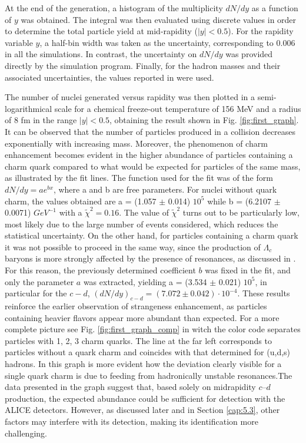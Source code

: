 \documentclass[12pt,a4paper]{book}
\begin{document}
	At the end of the generation, a histogram of the multiplicity $dN/dy$ as a function of $y$ was obtained. The integral was then evaluated using discrete values in order to determine the total particle yield at mid-rapidity ($|y| < 0.5$). For the rapidity variable $y$, a half-bin width was taken as the uncertainty, corresponding to 0.006 in all the simulations. In contrast, the uncertainty on $dN/dy$ was provided directly by the simulation program. Finally, for the hadron masses and their associated uncertainties, the values reported in \cite{ParticleDataGroup:2024cfk} were used.
	
	The number of nuclei generated versus rapidity was then plotted in a semi-logarithmical scale for a chemical freeze-out temperature of 156 MeV and a radius of 8 fm in the range $|y| <0.5$, obtaining the result shown in Fig. \ref{fig:first_graph}. It can be observed that the number of particles produced in a collision decreases exponentially with increasing mass. Moreover, the phenomenon of charm enhancement becomes evident in the higher abundance of particles containing a charm quark compared to what would be expected for particles of the same mass, as illustrated by the fit lines. The function used for the fit was of the form $dN/dy= a e^{bx}$, where a and b are free parameters. For nuclei without quark charm, the values obtained are a = (1.057 $\pm$ 0.014) $10^5$ while b = (6.2107 $\pm$ 0.0071) $GeV^{-1}$ with a $\tilde{\chi}^2 = 0.16$. The value of $\tilde{\chi}^2$ turns out to be particularly low, most likely due to the large number of events considered, which reduces the statistical uncertainty. On the other hand, for particles containing a charm quark it was not possible to proceed in the same way, since the production of $\Lambda_c$ baryons is more strongly affected by the presence of resonances, as discussed in \cite{Andronic_2021}. For this reason, the previously determined coefficient $b$ was fixed in the fit, and only the parameter $a$ was extracted, yielding a = (3.534 $\pm$ 0.021) $10^5$, in particular for the $c-d$, $(dN/dy)_{c-d}= (7.072 \pm 0.042) \cdot 10^{-4}$. These results reinforce the earlier observation of strangeness enhancement, as particles containing heavier flavors appear more abundant than expected. For a more complete picture see Fig. \ref{fig:first_graph_comp} in witch the color code separates particles with 1, 2, 3 charm quarks. The line at the far left corresponds to particles without a quark charm and coincides with that determined for (u,d,s) hadrons. In this graph is more evident how the deviation clearly visible for a single quark charm is due to feeding from hadronically unstable resonances.The data presented in the graph suggest that, based solely on midrapidity $c–d$ production, the expected abundance could be sufficient for detection with the ALICE detectors. However, as discussed later and in Section \ref{cap:5.3}, other factors may interfere with its detection, making its identification more challenging. 
\end{document}
